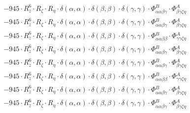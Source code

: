 \documentclass{article}
\begin{document}
\begin{subequations}
\begin{gather}
\begin{array}{c}
 \\[0.2em] 		 - 945 \cdot R_{z}^{6} \cdot R_{\zeta{}} \cdot R_{\eta{}} \cdot \delta{}\left(\alpha{}, \alpha{}\right) \cdot \delta{}\left(\beta{}, \beta{}\right) \cdot \delta{}\left(\gamma{}, \gamma{}\right) \cdot \Phi{}^{B}_{\alpha{}\alpha{}\beta{}\gamma{}} \cdot \Phi{}^{A}_{\beta{}\gamma{}\zeta{}\eta{}} 
 \\[0.2em] 		 - 945 \cdot R_{z}^{6} \cdot R_{\zeta{}} \cdot R_{\eta{}} \cdot \delta{}\left(\alpha{}, \alpha{}\right) \cdot \delta{}\left(\beta{}, \beta{}\right) \cdot \delta{}\left(\gamma{}, \gamma{}\right) \cdot \Phi{}^{B}_{\alpha{}\alpha{}\beta{}\gamma{}} \cdot \Phi{}^{A}_{\beta{}\gamma{}\zeta{}\eta{}} 
 \\[0.2em] 		 - 945 \cdot R_{z}^{6} \cdot R_{\zeta{}} \cdot R_{\eta{}} \cdot \delta{}\left(\alpha{}, \alpha{}\right) \cdot \delta{}\left(\beta{}, \beta{}\right) \cdot \delta{}\left(\gamma{}, \gamma{}\right) \cdot \Phi{}^{B}_{\alpha{}\alpha{}\beta{}\beta{}} \cdot \Phi{}^{A}_{\gamma{}\gamma{}\zeta{}\eta{}} 
 \\[0.2em] 		 - 945 \cdot R_{z}^{6} \cdot R_{\zeta{}} \cdot R_{\eta{}} \cdot \delta{}\left(\alpha{}, \alpha{}\right) \cdot \delta{}\left(\beta{}, \beta{}\right) \cdot \delta{}\left(\gamma{}, \gamma{}\right) \cdot \Phi{}^{B}_{\alpha{}\alpha{}\beta{}\gamma{}} \cdot \Phi{}^{A}_{\beta{}\gamma{}\zeta{}\eta{}} 
 \\[0.2em] 		 - 945 \cdot R_{z}^{6} \cdot R_{\zeta{}} \cdot R_{\eta{}} \cdot \delta{}\left(\alpha{}, \alpha{}\right) \cdot \delta{}\left(\beta{}, \beta{}\right) \cdot \delta{}\left(\gamma{}, \gamma{}\right) \cdot \Phi{}^{B}_{\alpha{}\alpha{}\beta{}\gamma{}} \cdot \Phi{}^{A}_{\beta{}\gamma{}\zeta{}\eta{}} 
 \\[0.2em] 		 - 945 \cdot R_{z}^{6} \cdot R_{\zeta{}} \cdot R_{\eta{}} \cdot \delta{}\left(\alpha{}, \alpha{}\right) \cdot \delta{}\left(\beta{}, \beta{}\right) \cdot \delta{}\left(\gamma{}, \gamma{}\right) \cdot \Phi{}^{B}_{\alpha{}\alpha{}\beta{}\beta{}} \cdot \Phi{}^{A}_{\gamma{}\gamma{}\zeta{}\eta{}} 
 \\[0.2em] 		 - 945 \cdot R_{z}^{6} \cdot R_{\zeta{}} \cdot R_{\eta{}} \cdot \delta{}\left(\alpha{}, \alpha{}\right) \cdot \delta{}\left(\beta{}, \beta{}\right) \cdot \delta{}\left(\gamma{}, \gamma{}\right) \cdot \Phi{}^{B}_{\alpha{}\alpha{}\beta{}\gamma{}} \cdot \Phi{}^{A}_{\beta{}\gamma{}\zeta{}\eta{}} 
 \\[0.2em] 		 - 945 \cdot R_{z}^{6} \cdot R_{\zeta{}} \cdot R_{\eta{}} \cdot \delta{}\left(\alpha{}, \alpha{}\right) \cdot \delta{}\left(\beta{}, \beta{}\right) \cdot \delta{}\left(\gamma{}, \gamma{}\right) \cdot \Phi{}^{B}_{\alpha{}\alpha{}\beta{}\gamma{}} \cdot \Phi{}^{A}_{\beta{}\gamma{}\zeta{}\eta{}} 

\end{array}
\end{gather}
\end{subequations}
\end{document}
